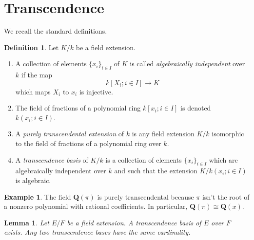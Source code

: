 \documentclass{stacks-project}
\theoremstyle{plain}
\newtheorem{lemma}[subsection]{Lemma}
\theoremstyle{definition}
\newtheorem{definition}[subsection]{Definition}
\newtheorem{example}[subsection]{Example}
\theoremstyle{remark}
\numberwithin{equation}{subsection}
\begin{document}
\section{Transcendence}
\label{section-transcendence}

\noindent
We recall the standard definitions.

\begin{definition}
\label{definition-transcendence}
Let $K/k$ be a field extension.
\begin{enumerate}
\item A collection of elements $\{x_i\}_{i \in I}$ of $K$ is called
{\it algebraically independent} over $k$ if the map
$$
k[X_i; i\in I] \longrightarrow K
$$
which maps $X_i$ to $x_i$ is injective.
\item The field of fractions of a polynomial ring
$k[x_i; i \in I]$ is denoted $k(x_i; i\in I)$.
\item A {\it purely transcendental extension} of $k$ is any
field extension $K/k$ isomorphic to the field of
fractions of a polynomial ring over $k$.
\item A {\it transcendence basis} of $K/k$ is a
collection of elements $\{x_i\}_{i \in I}$ which are
algebraically independent over $k$ and such that
the extension $K/k(x_i; i\in I)$ is algebraic.
\end{enumerate}
\end{definition}

\begin{example}
\label{example-pi-transcendental}
The field $\mathbf{Q}(\pi)$ is purely transcendental because
$\pi$ isn't the root of a nonzero polynomial with rational coefficients.
In particular, $\mathbf{Q}(\pi) \cong \mathbf{Q}(x)$.
\end{example}

\begin{lemma}
\label{lemma-transcendence-degree}
Let $E/F$ be a field extension. A transcendence basis of $E$ over $F$ exists.
Any two transcendence bases have the same cardinality.
\end{lemma}
\end{document}
